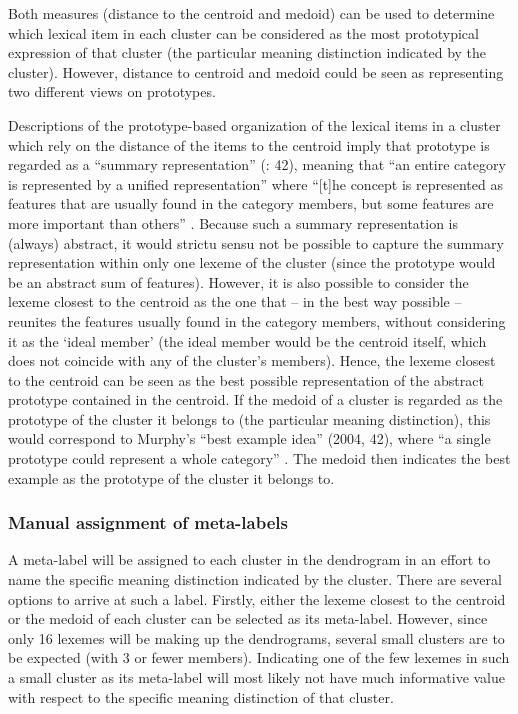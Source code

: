Both measures (distance to the centroid and medoid) can be used to determine which lexical item in each cluster can be considered as the most prototypical expression of that cluster (the particular meaning distinction indicated by the cluster). However, distance to centroid and medoid could be seen as representing two different views on prototypes.



Descriptions of the prototype-based organization of the lexical items in a cluster which rely on the distance of the items to the centroid imply that prototype is regarded as a “summary representation” (\citealt{murphy_big_2004}: 42), meaning that “an entire category is represented by a unified representation” where “[t]he concept is represented as features that are usually found in the category members, but some features are more important than others” \citep[42]{murphy_big_2004}. Because such a summary representation is (always) abstract, it would strictu sensu not be possible to capture the summary representation within only one lexeme of the cluster (since the prototype would be an abstract sum of features). However, it is also possible to consider the lexeme closest to the centroid as the one that – in the best way possible – reunites the features usually found in the category members, without considering it as the ‘ideal member’ (the ideal member would be the centroid itself, which does not coincide with any of the cluster’s members). Hence, the lexeme closest to the centroid can be seen as the best possible representation of the abstract prototype contained in the centroid. If the medoid of a cluster is regarded as the prototype of the cluster it belongs to (the particular meaning distinction), this would correspond to Murphy’s “best example idea” (2004, 42), where “a single prototype could represent a whole category” \citep[42]{murphy_big_2004}. The medoid then indicates the best example as the prototype of the cluster it belongs to.


\subsubsection{\label{sec:3.8.1.4}  Manual assignment of meta-labels}

A meta-label will be assigned to each cluster in the dendrogram in an effort to name the specific meaning distinction indicated by the cluster. There are several options to arrive at such a label. Firstly, either the lexeme closest to the centroid or the medoid of each cluster can be selected as its meta-label. However, since only 16 lexemes will be making up the dendrograms, several small clusters are to be expected (with 3 or fewer members). Indicating one of the few lexemes in such a small cluster as its meta-label will most likely not have much informative value with respect to the specific meaning distinction of that cluster.



